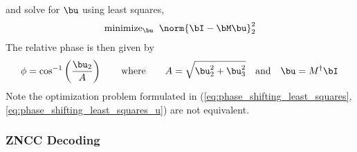\documentclass[../writeup.tex]{subfiles}
\begin{document}
and solve for $\bu$ using least squares,
\begin{align}
    \text{minimize}_{\bu}\;\;
        \norm{\bI-\bM\bu}_2^2
    \label{eq:phase_shifting_least_squares_u}
\end{align}
The relative phase is then given by
\begin{align*}
    \phi 
        = \cos^{-1}\left( \frac{\bu_2}{A} \right)
    \qquad\text{where}\qquad
    A
        = \sqrt{\bu_2^2 + \bu_3^2}
    \quad\text{and}\quad
    \bu
        = M^{\dagger} \bI
\end{align*}
Note the optimization problem formulated in (\ref{eq:phase_shifting_least_squares},\ref{eq:phase_shifting_least_squares_u}) are not equivalent. 

\subsubsection{ZNCC Decoding}
\end{document}
